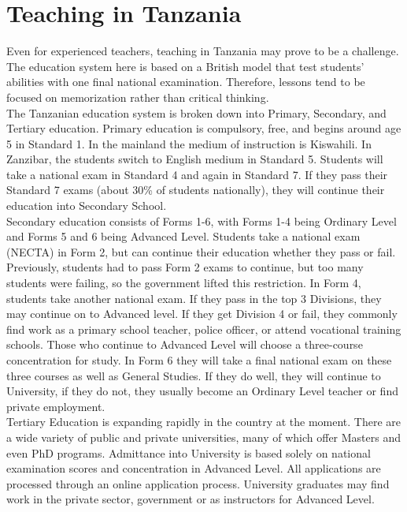 \section{Teaching in Tanzania}
Even for experienced teachers, teaching in Tanzania may prove to be a challenge.  The education system here is based on a British model that test students' abilities with one final national examination.  Therefore, lessons tend to be focused on memorization rather than critical thinking.\\

The Tanzanian education system is broken down into Primary, Secondary, and Tertiary education.  Primary education is compulsory, free, and begins around age 5 in Standard 1. In the mainland the medium of instruction is Kiswahili.  In Zanzibar, the students switch to English medium in Standard 5. Students will take a national exam in Standard 4 and again in Standard 7.  If they pass their Standard 7 exams (about 30\% of students nationally), they will continue their education into Secondary School.  \\

Secondary education consists of Forms 1-6, with Forms 1-4 being Ordinary Level and Forms 5 and 6 being Advanced Level.  Students take a national exam (NECTA) in Form 2, but can continue their education whether they pass or fail.  Previously, students had to pass Form 2 exams to continue, but too many students were failing, so the government lifted this restriction.  In Form 4, students take another national exam.  If they pass in the top 3 Divisions, they may continue on to Advanced level.  If they get Division 4 or fail, they commonly find work as a primary school teacher, police officer, or attend vocational training schools.   Those who continue to Advanced Level will choose a three-course concentration for study.  In Form 6 they will take a final national exam on these three courses as well as General Studies.  If they do well, they will continue to University, if they do not, they usually become an Ordinary Level teacher or find private employment.\\

Tertiary Education is expanding rapidly in the country at the moment.  There are a wide variety of public and private universities, many of which offer Masters and even PhD programs.  Admittance into University is based solely on national examination scores and concentration in Advanced Level.  All applications are processed through an online application process.  University graduates may find work in the private sector, government or as instructors for Advanced Level.

